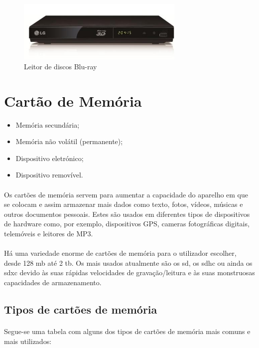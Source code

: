 \documentclass[a4paper]{report}
\begin{document}
\begin{figure}[H]
\center
\includegraphics[width=8cm]{Imagens/leitor_bluray.jpg}
\caption{Leitor de discos Blu-ray}
\end{figure}

\newpage

\section{Cartão de Memória}
\label{sect.cartaomemoria}

\begin{itemize}
\item Memória secundária;
\item Memória não volátil (permanente);
\item Dispositivo eletrónico;
\item Dispositivo removível.
\end{itemize}

\paragraph*{}Os cartões de memória servem para aumentar a capacidade do aparelho em que se colocam e assim armazenar mais dados como texto, fotos, vídeos, músicas e outros documentos pessoais.
Estes são usados em diferentes tipos de dispositivos de hardware como, por exemplo, dispositivos GPS, cameras fotográficas digitais, telemóveis e leitores de MP3. 
\paragraph*{}Há uma variedade enorme de cartões de memória para o utilizador escolher, desde 128 \ac{mb} até 2 \ac{tb}. Os mais usados atualmente são os \ac{sd}, os \ac{sdhc} ou ainda os \ac{sdxc} devido às suas rápidas velocidades de gravação/leitura e às suas monstruosas capacidades de armazenamento.

\subsection{Tipos de cartões de memória}

\paragraph*{}Segue-se uma tabela com alguns dos tipos de cartões de memória mais comuns e mais utilizados:
\end{document}
